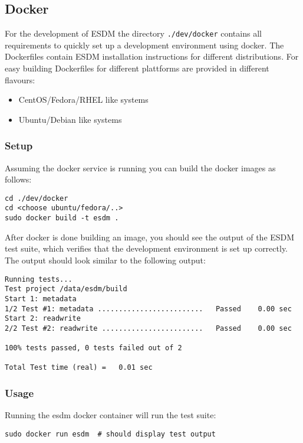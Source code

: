 \subsection{Docker}
For the development of ESDM the directory \lstinline|./dev/docker| contains all requirements to quickly set up a development environment using docker.
The Dockerfiles contain ESDM installation instructions for different distributions.
For easy building Dockerfiles for different plattforms are provided in different flavours:

\begin{itemize}
  \item CentOS/Fedora/RHEL like systems
  \item Ubuntu/Debian like systems
\end{itemize}

\subsubsection{Setup}

Assuming the docker service is running you can build the docker images as follows:

\begin{lstlisting}
cd ./dev/docker
cd <choose ubuntu/fedora/..>
sudo docker build -t esdm .
\end{lstlisting}

After docker is done building an image, you should see the output of the ESDM test suite, which verifies that the development environment is set up correctly. 
The output should look similar to the following output:

\begin{lstlisting}
Running tests...
Test project /data/esdm/build
Start 1: metadata
1/2 Test #1: metadata .........................   Passed    0.00 sec
Start 2: readwrite
2/2 Test #2: readwrite ........................   Passed    0.00 sec

100% tests passed, 0 tests failed out of 2

Total Test time (real) =   0.01 sec
\end{lstlisting}


\subsubsection{Usage}
Running the esdm docker container will run the test suite:

\begin{lstlisting}
sudo docker run esdm  # should display test output
\end{lstlisting}

